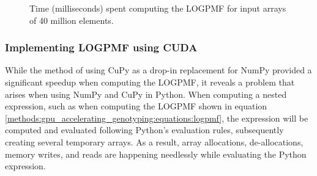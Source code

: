 \begin{figure}[H]
\begin{center}
\end{center}
\caption{
  Time (milliseconds) spent computing the LOGPMF for input arrays of 40 million elements.
}
\label{methods:gpu_accelerating_genotyping:figures:logpmf_benchmark}
\end{figure}

\subsubsection{Implementing LOGPMF using CUDA}
While the method of using CuPy as a drop-in replacement for NumPy provided a significant speedup when computing the LOGPMF, it reveals a problem that arises when using NumPy and CuPy in Python.
When computing a nested expression, such as when computing the LOGPMF shown in equation \ref{methods:gpu_accelerating_genotyping:equations:logpmf}, the expression will be computed and evaluated following Python's evaluation rules, subsequently creating several temporary arrays.
As a result, array allocations, de-allocations, memory writes, and reads are happening needlessly while evaluating the Python expression.

